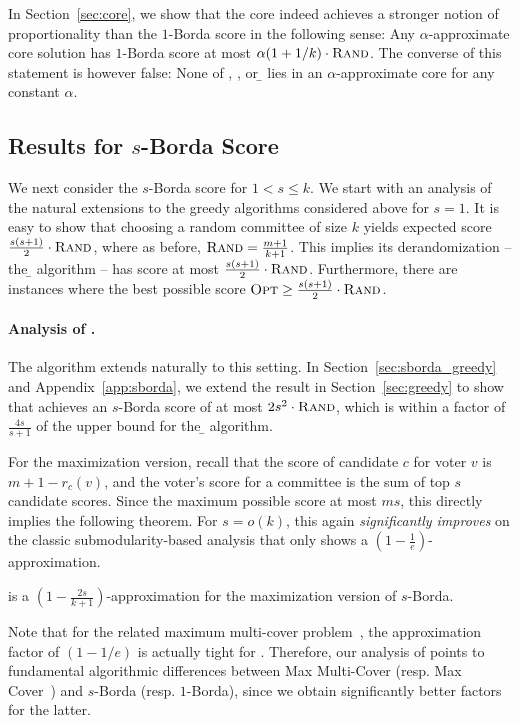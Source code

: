 In Section~\ref{sec:core}, we show that the core indeed achieves a stronger notion of proportionality than the $1$-Borda score in the following sense: Any $\alpha$-approximate core solution has $1$-Borda score at most $\alpha (1+1/k) \cdot {\normalfont\textsc{Rand}}$. The converse of this statement is however false: None of \opt{}, \g{}, or \b{} lies in an $\alpha$-approximate core for any constant $\alpha$. 

\subsection{Results for $s$-Borda Score}
We next consider the $s$-Borda score for $1 < s \le k$. We start with an analysis of the natural extensions to the greedy algorithms considered above for $s = 1$. It is easy to show that choosing a random committee of size $k$ yields expected score $\frac{s(s+1)}{2} \cdot {\normalfont\textsc{Rand}}$, where as before, ${\normalfont\textsc{Rand}} = \frac{m+1}{k+1}$. This implies its derandomization -- the \b{} algorithm -- has score at most $\frac{s(s+1)}{2} \cdot {\normalfont\textsc{Rand}}$. Furthermore, there are instances where the best possible score ${\normalfont\textsc{Opt}} \ge \frac{s(s+1)}{2} \cdot {\normalfont\textsc{Rand}}$.

\paragraph{Analysis of \g{}.}
The \g{} algorithm extends naturally to this setting. In Section~\ref{sec:sborda_greedy} and Appendix~\ref{app:sborda}, we extend the result in Section~\ref{sec:greedy} to show that \g{} achieves an $s$-Borda score of at most $2s^2 \cdot {\normalfont\textsc{Rand}}$, which is within a factor of $\frac{4s}{s + 1}$ of the upper bound for the \b{} algorithm.  

For the maximization version, recall that the score of candidate $c$ for voter $v$ is $m + 1 - r_c(v)$, and the voter's score for a committee is the sum of top $s$ candidate scores. Since the maximum possible score at most $ms$, this directly implies the following theorem.  For $s = o(k)$, this again {\em significantly improves} on the classic submodularity-based analysis that only shows a $\left(1 - \frac{1}{e}\right)$-approximation.
\begin{theorem}
\g{} is a  $\left(1-\frac{2s}{k+1}\right)$-approximation for the maximization version of $s$-Borda.
\end{theorem}
Note that for the related maximum multi-cover problem~\cite{Barman}, the approximation factor of $(1-1/e)$ is actually tight for \g{}. Therefore, our analysis of \g{} points to fundamental algorithmic differences between {\sc Max Multi-Cover} (resp. {\sc Max Cover}~\cite{Feige}) and $s$-Borda (resp. $1$-Borda), since we obtain significantly better factors for the latter.

